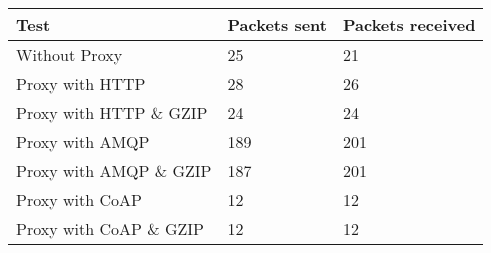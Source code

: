 \begin{tabular}{|l|l|l|}
\hline
\textbf{Test} & \textbf{Packets sent} & \textbf{Packets received} \\ \hline
Without Proxy                    &25         & 21        \\ \hline 
Proxy with HTTP                  &28         & 26        \\ \hline 
Proxy with HTTP \& GZIP          &24         & 24        \\ \hline 
Proxy with AMQP                  &189        & 201       \\ \hline 
Proxy with AMQP \& GZIP          &187        & 201       \\ \hline 
Proxy with CoAP                  &12         & 12        \\ \hline 
Proxy with CoAP \& GZIP          &12         & 12        \\ \hline 
\end{tabular}